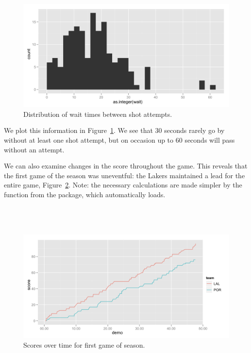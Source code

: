 \documentclass[article]{jss}
\begin{document}
\\
\\

\begin{figure}[htpb]
  \centering
  \includegraphics[width=\textwidth]{wait-histogram.png}        
  \caption{Distribution of wait times between shot attempts.}
  \label{fig:waits}
\end{figure}

We plot this information in Figure~\ref{fig:waits}. We see that 30 seconds rarely go by without at least one shot attempt, but on occasion up to 60 seconds will pass without an attempt.

We can also examine changes in the score throughout the game. This reveals that the first game of the season was uneventful: the Lakers maintained a lead for the entire game, Figure~\ref{fig:scores}. Note: the necessary calculations are made simpler by the  function from the  package, which  automatically loads. \\

\\
\\
\\

\begin{figure}[htpb]
  \centering
  \includegraphics[width=\textwidth]{score-comparison.png}        
  \caption{Scores over time for first game of season.}
  \label{fig:scores}
\end{figure}
\end{document}
